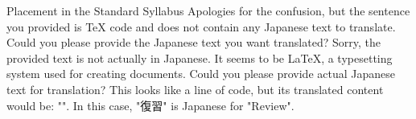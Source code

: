 Placement in the Standard Syllabus
Apologies for the confusion, but the sentence you provided is TeX code and does not contain any Japanese text to translate. Could you please provide the Japanese text you want translated?
Sorry, the provided text is not actually in Japanese. It seems to be LaTeX, a typesetting system used for creating documents. Could you please provide actual Japanese text for translation?
This looks like a line of code, but its translated content would be: "\protected@file@percent". In this case, "復習" is Japanese for "Review".
